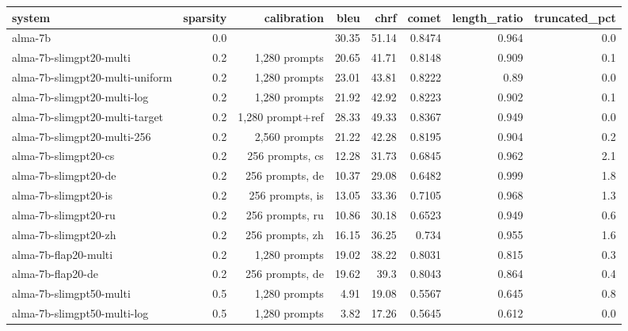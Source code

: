 \begin{tabular}{lrrrrrrr}
\toprule
system & sparsity & calibration & bleu & chrf & comet & length_ratio & truncated_pct \\
\midrule
alma-7b & 0.0 &  & 30.35 & 51.14 & 0.8474 & 0.964 & 0.0 \\
alma-7b-slimgpt20-multi & 0.2 & 1,280 prompts & 20.65 & 41.71 & 0.8148 & 0.909 & 0.1 \\
alma-7b-slimgpt20-multi-uniform & 0.2 & 1,280 prompts & 23.01 & 43.81 & 0.8222 & 0.89 & 0.0 \\
alma-7b-slimgpt20-multi-log & 0.2 & 1,280 prompts & 21.92 & 42.92 & 0.8223 & 0.902 & 0.1 \\
alma-7b-slimgpt20-multi-target & 0.2 & 1,280 prompt+ref & 28.33 & 49.33 & 0.8367 & 0.949 & 0.0 \\
alma-7b-slimgpt20-multi-256 & 0.2 & 2,560 prompts & 21.22 & 42.28 & 0.8195 & 0.904 & 0.2 \\
alma-7b-slimgpt20-cs & 0.2 & 256 prompts, cs & 12.28 & 31.73 & 0.6845 & 0.962 & 2.1 \\
alma-7b-slimgpt20-de & 0.2 & 256 prompts, de & 10.37 & 29.08 & 0.6482 & 0.999 & 1.8 \\
alma-7b-slimgpt20-is & 0.2 & 256 prompts, is & 13.05 & 33.36 & 0.7105 & 0.968 & 1.3 \\
alma-7b-slimgpt20-ru & 0.2 & 256 prompts, ru & 10.86 & 30.18 & 0.6523 & 0.949 & 0.6 \\
alma-7b-slimgpt20-zh & 0.2 & 256 prompts, zh & 16.15 & 36.25 & 0.734 & 0.955 & 1.6 \\
alma-7b-flap20-multi & 0.2 & 1,280 prompts & 19.02 & 38.22 & 0.8031 & 0.815 & 0.3 \\
alma-7b-flap20-de & 0.2 & 256 prompts, de & 19.62 & 39.3 & 0.8043 & 0.864 & 0.4 \\
alma-7b-slimgpt50-multi & 0.5 & 1,280 prompts & 4.91 & 19.08 & 0.5567 & 0.645 & 0.8 \\
alma-7b-slimgpt50-multi-log & 0.5 & 1,280 prompts & 3.82 & 17.26 & 0.5645 & 0.612 & 0.0 \\
\bottomrule
\end{tabular}
